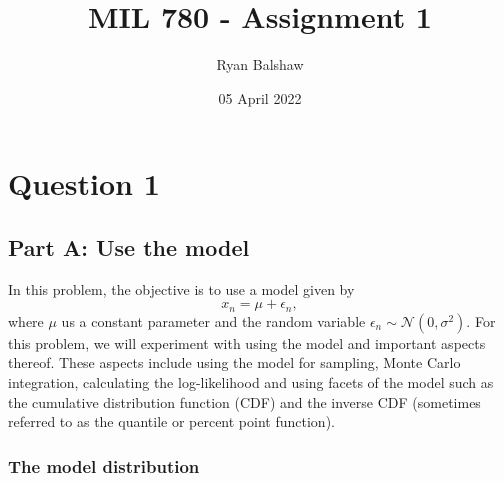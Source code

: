 \documentclass{article}
\title{MIL 780 - Assignment 1}
\author{Ryan Balshaw}
\date{05 April 2022}
\begin{document}
\maketitle

\section{Question 1}

\subsection{Part A: Use the model}
In this problem, the objective is to use a model given by
\begin{equation}\label{eq:Model1}
x_n = \mu + \epsilon_n,
\end{equation}
where $\mu$ us a constant parameter and the random variable $\epsilon_n \sim \mathcal{N}(0, \sigma^2)$. For this problem, we will experiment with using the model and important aspects thereof. These aspects include using the model for sampling, Monte Carlo integration, calculating the log-likelihood and using facets of the model such as the cumulative distribution function (CDF) and the inverse CDF (sometimes referred to as the quantile or percent point function).

\subsubsection{The model distribution}
\end{document}
